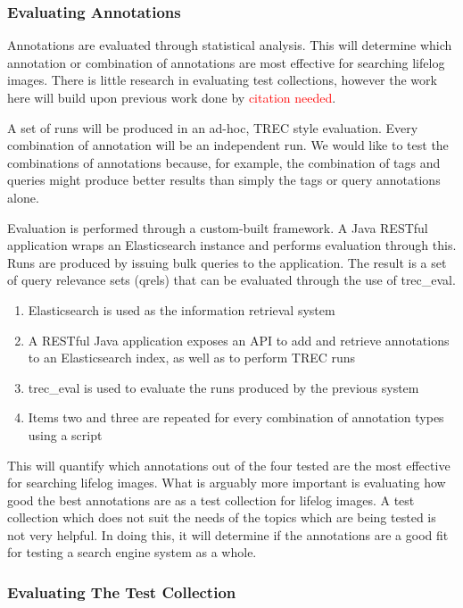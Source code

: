 \documentclass[12pt,a4paper]{article}
\newcommand\todo[1]{\textcolor{red}{#1}}
\begin{document}
\subsubsection{Evaluating Annotations}

Annotations are evaluated through statistical analysis. This will determine which annotation or combination of annotations are most effective for searching lifelog images. There is little research in evaluating test collections, however the work here will build upon previous work done by \todo{citation needed}.

A set of runs will be produced in an ad-hoc, TREC style evaluation. Every combination of annotation will be an independent run. We would like to test the combinations of annotations because, for example, the combination of tags and queries might produce better results than simply the tags or query annotations alone.

Evaluation is performed through a custom-built framework. A Java RESTful application wraps an Elasticsearch instance and performs evaluation through this. Runs are produced by issuing bulk queries to the application. The result is a set of query relevance sets (qrels) that can be evaluated through the use of trec\_eval.

\begin{enumerate}
    \item Elasticsearch is used as the information retrieval system
    \item A RESTful Java application exposes an API to add and retrieve annotations to an Elasticsearch index, as well as to perform TREC runs
    \item trec\_eval is used to evaluate the runs produced by the previous system
    \item Items two and three are repeated for every combination of annotation types using a script
\end{enumerate}

This will quantify which annotations out of the four tested are the most effective for searching lifelog images. What is arguably more important is evaluating how good the best annotations are as a test collection for lifelog images. A test collection which does not suit the needs of the topics which are being tested is not very helpful. In doing this, it will determine if the annotations are a good fit for testing a search engine system as a whole.

\subsubsection{Evaluating The Test Collection}
\end{document}
